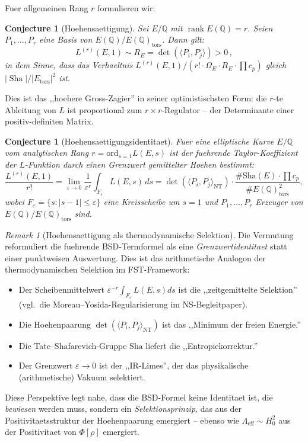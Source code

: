 \documentclass[aps,prd,twocolumn,superscriptaddress,nofootinbib]{revtex4-2}
\newtheorem{conjecture}[theorem]{Conjecture}
\theoremstyle{definition}
\theoremstyle{remark}
\newtheorem{remark}[theorem]{Remark}
\DeclareMathOperator{\rank}{rank}
\DeclareMathOperator{\Sha}{Sha}
\begin{document}
Fuer allgemeinen Rang $r$ formulieren wir:

\begin{conjecture}[Hoehensaettigung]
\label{conj:height_saturation}
Sei $E/\mathbb{Q}$ mit $\rank E(\mathbb{Q}) = r$. Seien $P_1, \ldots, P_r$ eine Basis von $E(\mathbb{Q})/E(\mathbb{Q})_{\mathrm{tors}}$. Dann gilt:
\begin{equation}
L^{(r)}(E,1) \sim R_E = \det\!\left(\langle P_i, P_j \rangle\right) > 0\,,
\label{eq:height_saturation}
\end{equation}
in dem Sinne, dass das Verhaeltnis $L^{(r)}(E,1)/(r! \cdot \Omega_E \cdot R_E \cdot \prod c_p)$ gleich $|\Sha|/|E_{\mathrm{tors}}|^2$ ist.
\end{conjecture}

Dies ist das ,,hoehere Gross-Zagier'' in seiner optimistischsten Form: die $r$-te Ableitung von $L$ ist proportional zum $r \times r$-Regulator -- der Determinante einer positiv-definiten Matrix.

\begin{conjecture}[Hoehensaettigungsidentitaet]
\label{conj:height-saturation}
Fuer eine elliptische Kurve $E/\mathbb{Q}$ vom analytischen Rang $r = \mathrm{ord}_{s=1} L(E,s)$ ist der fuehrende Taylor-Koeffizient der $L$-Funktion durch einen Grenzwert gemittelter Hoehen bestimmt:
\[
\frac{L^{(r)}(E, 1)}{r!} = \lim_{\varepsilon \to 0} \frac{1}{\varepsilon^r} \int_{F_\varepsilon} L(E, s) \, ds = \det(\langle P_i, P_j \rangle_{\mathrm{NT}}) \cdot \frac{\#\mathrm{Sha}(E) \cdot \prod c_p}{\#E(\mathbb{Q})_{\mathrm{tors}}^2},
\]
wobei $F_\varepsilon = \{s : |s - 1| \leq \varepsilon\}$ eine Kreisscheibe um $s = 1$ und $P_1, \ldots, P_r$ Erzeuger von $E(\mathbb{Q}) / E(\mathbb{Q})_{\mathrm{tors}}$ sind.
\end{conjecture}

\begin{remark}[Hoehensaettigung als thermodynamische Selektion]
\label{rem:height-saturation}
Die Vermutung reformuliert die fuehrende BSD-Termformel als eine \emph{Grenzwertidentitaet} statt einer punktweisen Auswertung. Dies ist das arithmetische Analogon der thermodynamischen Selektion im FST-Framework:
\begin{itemize}
\item Der Scheibenmittelwert $\varepsilon^{-r} \int_{F_\varepsilon} L(E,s) ds$ ist die ,,zeitgemittelte Selektion'' (vgl.\ die Moreau--Yosida-Regularisierung im NS-Begleitpaper).
\item Die Hoehenpaarung $\det(\langle P_i, P_j \rangle_{\mathrm{NT}})$ ist das ,,Minimum der freien Energie.''
\item Die Tate--Shafarevich-Gruppe $\mathrm{Sha}$ liefert die ,,Entropiekorrektur.''
\item Der Grenzwert $\varepsilon \to 0$ ist der ,,IR-Limes'', der das physikalische (arithmetische) Vakuum selektiert.
\end{itemize}
Diese Perspektive legt nahe, dass die BSD-Formel keine Identitaet ist, die \emph{bewiesen} werden muss, sondern ein \emph{Selektionsprinzip}, das aus der Positivitaetsstruktur der Hoehenpaarung emergiert -- ebenso wie $\Lambda_{\mathrm{eff}} \sim H_0^2$ aus der Positivitaet von $\Phi[\rho]$ emergiert.
\end{remark}
\end{document}
